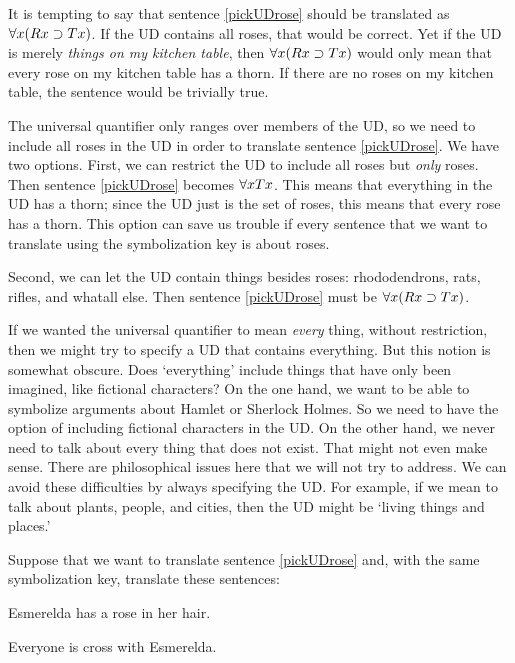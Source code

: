 It is tempting to say that sentence \ref{pickUDrose} should be translated as $\forall x(Rx \supset Tx)$. If the UD contains all roses, that would be correct. Yet if the UD is merely \emph{things on my kitchen table}, then $\forall x(Rx \supset Tx)$ would only mean that every rose on my kitchen table has a thorn. If there are no roses on my kitchen table, the sentence would be trivially true.

The universal quantifier only ranges over members of the UD, so we need to include all roses in the UD in order to translate sentence \ref{pickUDrose}. We have two options. First, we can restrict the UD to include all roses but \emph{only} roses. Then sentence \ref{pickUDrose} becomes $\forall x Tx$. This means that everything in the UD has a thorn; since the UD just is the set of roses, this means that every rose has a thorn. This option can save us trouble if every sentence that we want to translate using the symbolization key is about roses.

Second, we can let the UD contain things besides roses: rhododendrons, rats, rifles, and whatall else. Then sentence \ref{pickUDrose} must be $\forall x(Rx \supset Tx)$.

If we wanted the universal quantifier to mean \emph{every} thing, without restriction, then we might try to specify a UD that contains everything. But this notion is somewhat obscure. Does `everything' include things that have only been imagined, like fictional characters? On the one hand, we want to be able to symbolize arguments about Hamlet or Sherlock Holmes. So we need to have the option of including fictional characters in the UD. On the other hand, we never need to talk about every thing that does not exist. That might not even make sense. There are philosophical issues here that we will not try to address. We can avoid these difficulties by always specifying the UD. For example, if we mean to talk about plants, people, and cities, then the UD might be `living things and places.'

Suppose that we want to translate sentence \ref{pickUDrose} and, with the same symbolization key, translate these sentences:

\begin{earg}
\item[\ex{pickUDhair}] Esmerelda has a rose in her hair.
\item[\ex{pickUDcross}] Everyone is cross with Esmerelda.
\end{earg}

